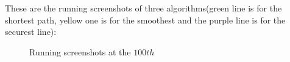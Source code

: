 \documentclass[a4paper, 11pt]{article}
\begin{document}
These are the running screenshots of three algorithms(green line is for the shortest path,
yellow one is for the smoothest and the purple line is for the securest line):\\
\begin{figure}[htb]
    \begin{center}
    \end{center}
    \caption{Running screenshots at the $100th$}
\end{figure}
\newpage
\end{document}
